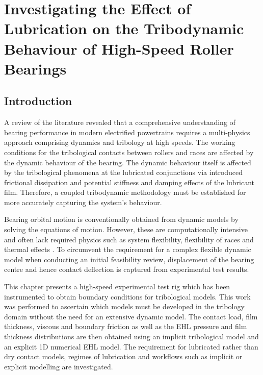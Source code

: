 \chapter{Investigating the Effect of Lubrication on the Tribodynamic Behaviour of High-Speed Roller Bearings}
\label{Investigating the Effect of Lubrication on the Tribodynamic Behaviour of High-Speed Roller Bearings}

\section{Introduction}

A review of the literature revealed that a comprehensive understanding of bearing performance in modern electrified powertrains requires a multi-physics approach comprising dynamics and tribology at high speeds. The working conditions for the tribological contacts between rollers and races are affected by the dynamic behaviour of the bearing. The dynamic behaviour itself is affected by the tribological phenomena at the lubricated conjunctions via introduced frictional dissipation and potential stiffness \cite{Hao2020} \cite{Akemi2020} and damping effects of the lubricant film. Therefore, a coupled tribodynamic methodology must be established for more accurately capturing the system’s behaviour.

Bearing orbital motion is conventionally obtained from dynamic models by solving the equations of motion. However, these are computationally intensive and often lack required physics such as system flexibility, flexibility of races and thermal effects \cite{Matsubara1988} \cite{Wang2015} \cite{Liu2017c}. To circumvent the requirement for a complex flexible dynamic model when conducting an initial feasibility review, displacement of the bearing centre and hence contact deflection is captured from experimental test results.

This chapter presents a high-speed experimental test rig which has been instrumented to obtain boundary conditions for tribological models. This work was performed to ascertain which models must be developed in the tribology domain without the need for an extensive dynamic model. The contact load, film thickness, viscous and boundary friction as well as the EHL pressure and film thickness distributions are then obtained using an implicit tribological model and an explicit 1D numerical EHL model. The requirement for lubricated rather than dry contact models, regimes of lubrication and workflows such as implicit or explicit modelling are investigated.

